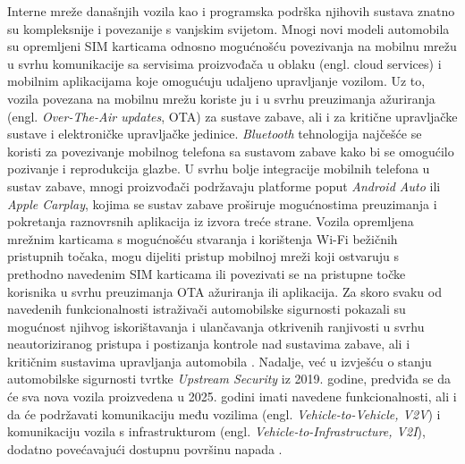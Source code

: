 \documentclass[times, utf8, diplomski, numeric]{fer}
\begin{document}
Interne mreže današnjih vozila kao i programska podrška njihovih sustava znatno su kompleksnije i povezanije s vanjskim svijetom\cite{huq2020driving}. Mnogi novi modeli automobila su opremljeni SIM karticama odnosno mogućnošću povezivanja na mobilnu mrežu u svrhu komunikacije sa servisima proizvođača u oblaku (engl. cloud services) i mobilnim aplikacijama koje omogućuju udaljeno upravljanje vozilom. Uz to, vozila povezana na mobilnu mrežu koriste ju i u svrhu preuzimanja ažuriranja (engl. \textit{Over-The-Air updates}, OTA) za sustave zabave, ali i za kritične upravljačke sustave i elektroničke upravljačke jedinice. \textit{Bluetooth} tehnologija najčešće se koristi za povezivanje mobilnog telefona sa sustavom zabave kako bi se omogućilo pozivanje i reprodukcija glazbe. U svrhu bolje integracije mobilnih telefona u sustav zabave, mnogi proizvođači podržavaju platforme poput \textit{Android Auto} ili \textit{Apple Carplay}, kojima se sustav zabave proširuje mogućnostima preuzimanja i pokretanja raznovrsnih aplikacija iz izvora treće strane. Vozila opremljena mrežnim karticama s mogućnošću stvaranja i korištenja Wi-Fi bežičnih pristupnih točaka, mogu dijeliti pristup mobilnoj mreži koji ostvaruju s prethodno navedenim SIM karticama ili povezivati se na pristupne točke korisnika u svrhu preuzimanja OTA ažuriranja ili aplikacija. Za skoro svaku od navedenih funkcionalnosti istraživači automobilske sigurnosti pokazali su mogućnost njihvog iskorištavanja i ulančavanja otkrivenih ranjivosti u svrhu neautoriziranog pristupa i postizanja kontrole nad sustavima zabave, ali i kritičnim sustavima upravljanja automobila \cite{nie2017free, nie2018over, cai20190, tencent2018bmw, miller2015remote, curry2023web}. Nadalje, već u izvješću o stanju automobilske sigurnosti tvrtke \textit{Upstream Security} iz 2019. godine, predviđa se da će sva nova vozila proizvedena u 2025. godini imati navedene funkcionalnosti, ali i da će podržavati komunikaciju među vozilima (engl. \textit{Vehicle-to-Vehicle, V2V}) i komunikaciju vozila s infrastrukturom (engl. \textit{Vehicle-to-Infrastructure, V2I}), dodatno povećavajući dostupnu površinu napada \cite{upstream2019report}.
\end{document}
